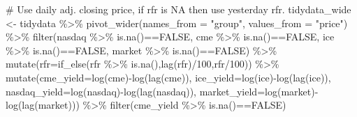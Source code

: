 \documentclass[
  letterpaper,
  DIV=11,
  numbers=noendperiod]{scrreprt}
\newenvironment{Shaded}{\begin{snugshade}}{\end{snugshade}}
\newcommand{\AttributeTok}[1]{\textcolor[rgb]{0.40,0.45,0.13}{#1}}
\newcommand{\CommentTok}[1]{\textcolor[rgb]{0.37,0.37,0.37}{#1}}
\newcommand{\ConstantTok}[1]{\textcolor[rgb]{0.56,0.35,0.01}{#1}}
\newcommand{\DecValTok}[1]{\textcolor[rgb]{0.68,0.00,0.00}{#1}}
\newcommand{\FunctionTok}[1]{\textcolor[rgb]{0.28,0.35,0.67}{#1}}
\newcommand{\NormalTok}[1]{\textcolor[rgb]{0.00,0.23,0.31}{#1}}
\newcommand{\OtherTok}[1]{\textcolor[rgb]{0.00,0.23,0.31}{#1}}
\newcommand{\SpecialCharTok}[1]{\textcolor[rgb]{0.37,0.37,0.37}{#1}}
\newcommand{\StringTok}[1]{\textcolor[rgb]{0.13,0.47,0.30}{#1}}
\begin{document}
\begin{Shaded}
\begin{Highlighting}[]
\CommentTok{\# Use daily adj. closing price, if rfr is NA then use yesterday rfr.}
\NormalTok{tidydata\_wide }\OtherTok{\textless{}{-}}\NormalTok{ tidydata }\SpecialCharTok{\%\textgreater{}\%} 
  \FunctionTok{pivot\_wider}\NormalTok{(}\AttributeTok{names\_from =} \StringTok{"group"}\NormalTok{, }\AttributeTok{values\_from =} \StringTok{"price"}\NormalTok{) }\SpecialCharTok{\%\textgreater{}\%} 
  \FunctionTok{filter}\NormalTok{(nasdaq }\SpecialCharTok{\%\textgreater{}\%} \FunctionTok{is.na}\NormalTok{()}\SpecialCharTok{==}\ConstantTok{FALSE}\NormalTok{,}
\NormalTok{         cme }\SpecialCharTok{\%\textgreater{}\%} \FunctionTok{is.na}\NormalTok{()}\SpecialCharTok{==}\ConstantTok{FALSE}\NormalTok{,}
\NormalTok{         ice }\SpecialCharTok{\%\textgreater{}\%} \FunctionTok{is.na}\NormalTok{()}\SpecialCharTok{==}\ConstantTok{FALSE}\NormalTok{,}
\NormalTok{         market }\SpecialCharTok{\%\textgreater{}\%} \FunctionTok{is.na}\NormalTok{()}\SpecialCharTok{==}\ConstantTok{FALSE}\NormalTok{) }\SpecialCharTok{\%\textgreater{}\%} 
  \FunctionTok{mutate}\NormalTok{(}\AttributeTok{rfr=}\FunctionTok{if\_else}\NormalTok{(rfr }\SpecialCharTok{\%\textgreater{}\%} \FunctionTok{is.na}\NormalTok{(),}\FunctionTok{lag}\NormalTok{(rfr)}\SpecialCharTok{/}\DecValTok{100}\NormalTok{,rfr}\SpecialCharTok{/}\DecValTok{100}\NormalTok{)) }\SpecialCharTok{\%\textgreater{}\%} 
  \FunctionTok{mutate}\NormalTok{(}\AttributeTok{cme\_yield=}\FunctionTok{log}\NormalTok{(cme)}\SpecialCharTok{{-}}\FunctionTok{log}\NormalTok{(}\FunctionTok{lag}\NormalTok{(cme)),}
         \AttributeTok{ice\_yield=}\FunctionTok{log}\NormalTok{(ice)}\SpecialCharTok{{-}}\FunctionTok{log}\NormalTok{(}\FunctionTok{lag}\NormalTok{(ice)),}
         \AttributeTok{nasdaq\_yield=}\FunctionTok{log}\NormalTok{(nasdaq)}\SpecialCharTok{{-}}\FunctionTok{log}\NormalTok{(}\FunctionTok{lag}\NormalTok{(nasdaq)),}
         \AttributeTok{market\_yield=}\FunctionTok{log}\NormalTok{(market)}\SpecialCharTok{{-}}\FunctionTok{log}\NormalTok{(}\FunctionTok{lag}\NormalTok{(market))) }\SpecialCharTok{\%\textgreater{}\%} 
  \FunctionTok{filter}\NormalTok{(cme\_yield }\SpecialCharTok{\%\textgreater{}\%} \FunctionTok{is.na}\NormalTok{()}\SpecialCharTok{==}\ConstantTok{FALSE}\NormalTok{)}
\end{Highlighting}
\end{Shaded}
\end{document}
